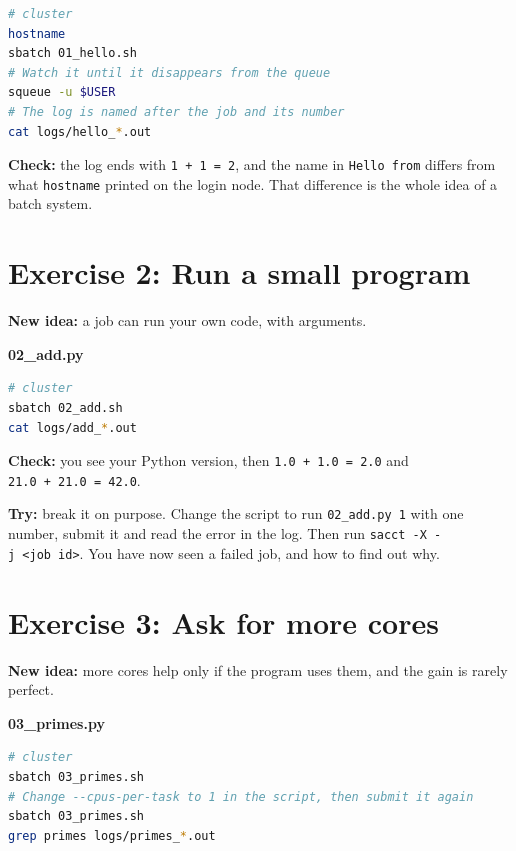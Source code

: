 \begin{lstlisting}[language=bash]
# cluster
hostname
sbatch 01_hello.sh
# Watch it until it disappears from the queue
squeue -u $USER
# The log is named after the job and its number
cat logs/hello_*.out
\end{lstlisting}

\textbf{Check:} the log ends with \texttt{1\ +\ 1\ =\ 2}, and the name in \texttt{Hello\ from} differs from what \texttt{hostname} printed on the login node. That difference is the whole idea of a batch system.

\section{Exercise 2: Run a small program}\label{exercise-2-run-a-small-program}

\textbf{New idea:} a job can run your own code, with arguments.

\textbf{02\_add.py}



\begin{lstlisting}[language=bash]
# cluster
sbatch 02_add.sh
cat logs/add_*.out
\end{lstlisting}

\textbf{Check:} you see your Python version, then \texttt{1.0\ +\ 1.0\ =\ 2.0} and \texttt{21.0\ +\ 21.0\ =\ 42.0}.

\textbf{Try:} break it on purpose. Change the script to run \texttt{02\_add.py\ 1} with one number, submit it and read the error in the log. Then run \texttt{sacct\ -X\ -j\ \textless{}job\ id\textgreater{}}. You have now seen a failed job, and how to find out why.

\section{Exercise 3: Ask for more cores}\label{exercise-3-ask-for-more-cores}

\textbf{New idea:} more cores help only if the program uses them, and the gain is rarely perfect.

\textbf{03\_primes.py}



\begin{lstlisting}[language=bash]
# cluster
sbatch 03_primes.sh
# Change --cpus-per-task to 1 in the script, then submit it again
sbatch 03_primes.sh
grep primes logs/primes_*.out
\end{lstlisting}

